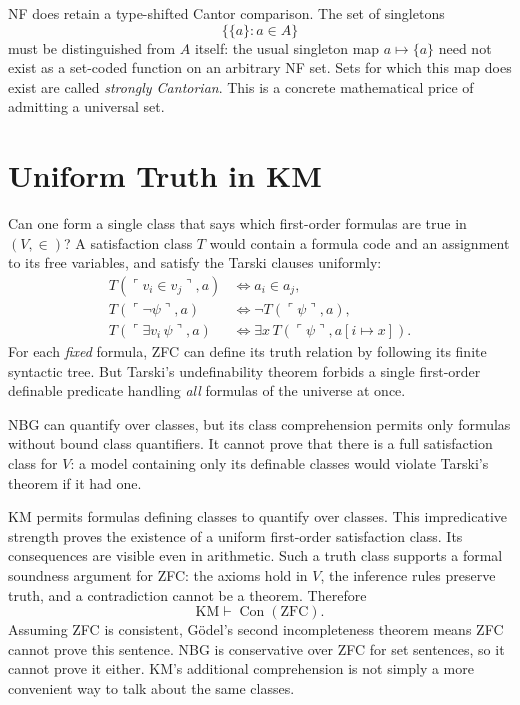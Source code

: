 NF does retain a type-shifted Cantor comparison. The set of singletons
\[
 \{\{a\}:a\in A\}
\]
must be distinguished from \(A\) itself: the usual singleton map \(a\mapsto\{a\}\) need not exist as a set-coded function on an arbitrary NF set. Sets for which this map does exist are called \emph{strongly Cantorian}. This is a concrete mathematical price of admitting a universal set.

\section{Uniform Truth in KM}

Can one form a single class that says which first-order formulas are true in \((V,\in)\)? A satisfaction class \(T\) would contain a formula code and an assignment to its free variables, and satisfy the Tarski clauses uniformly:
\[
\begin{aligned}
 T(\ulcorner v_i\in v_j\urcorner,a)
 &\iff a_i\in a_j,\\
 T(\ulcorner\neg\psi\urcorner,a)
 &\iff\neg T(\ulcorner\psi\urcorner,a),\\
 T(\ulcorner\exists v_i\,\psi\urcorner,a)
 &\iff\exists x\,T(\ulcorner\psi\urcorner,a[i\mapsto x]).
\end{aligned}
\]
For each \emph{fixed} formula, ZFC can define its truth relation by following its finite syntactic tree. But Tarski's undefinability theorem forbids a single first-order definable predicate handling \emph{all} formulas of the universe at once.

NBG can quantify over classes, but its class comprehension permits only formulas without bound class quantifiers. It cannot prove that there is a full satisfaction class for \(V\): a model containing only its definable classes would violate Tarski's theorem if it had one.

KM permits formulas defining classes to quantify over classes. This impredicative strength proves the existence of a uniform first-order satisfaction class. Its consequences are visible even in arithmetic. Such a truth class supports a formal soundness argument for ZFC: the axioms hold in \(V\), the inference rules preserve truth, and a contradiction cannot be a theorem. Therefore
\[
 \boxed{\mathrm{KM}\vdash\operatorname{Con}(\mathrm{ZFC}).}
\]
Assuming ZFC is consistent, Gödel's second incompleteness theorem means ZFC cannot prove this sentence. NBG is conservative over ZFC for set sentences, so it cannot prove it either. KM's additional comprehension is not simply a more convenient way to talk about the same classes.

